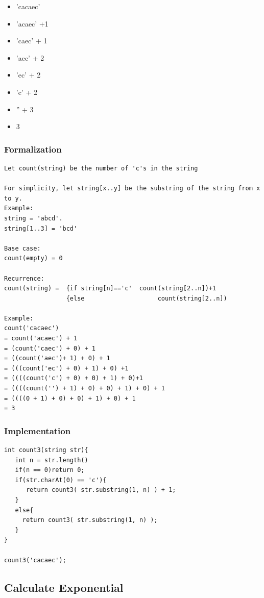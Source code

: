 \documentclass[11pt,oneside]{book}
\begin{document}
\begin{itemize}
\item 'cacaec'
\item 'acaec' +1
\item 'caec' + 1
\item 'aec' + 2
\item 'ec' + 2
\item 'c'  + 2
\item '' + 3
\item 3
\end{itemize}

\subsubsection{Formalization}

\begin{lstlisting}
Let count(string) be the number of 'c's in the string

For simplicity, let string[x..y] be the substring of the string from x to y.
Example: 
string = 'abcd'.
string[1..3] = 'bcd'

Base case:
count(empty) = 0

Recurrence:
count(string) =  {if string[n]=='c'  count(string[2..n])+1
                 {else                    count(string[2..n])

Example:
count('cacaec')
= count('acaec') + 1
= (count('caec') + 0) + 1
= ((count('aec')+ 1) + 0) + 1
= (((count('ec') + 0) + 1) + 0) +1
= ((((count('c') + 0) + 0) + 1) + 0)+1
= ((((count('') + 1) + 0) + 0) + 1) + 0) + 1
= ((((0 + 1) + 0) + 0) + 1) + 0) + 1
= 3
\end{lstlisting}

\subsubsection{Implementation}

\begin{lstlisting}
int count3(string str){
   int n = str.length()
   if(n == 0)return 0;
   if(str.charAt(0) == 'c'){
      return count3( str.substring(1, n) ) + 1;
   }
   else{
     return count3( str.substring(1, n) );
   }
}

count3('cacaec');

\end{lstlisting}

\subsection{Calculate Exponential}
\end{document}
